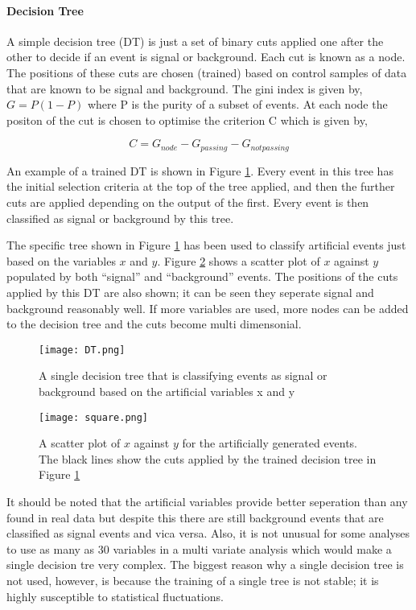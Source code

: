 \paragraph{Decision Tree}
A simple decision tree (DT) is just a set of binary cuts applied one after the other to decide if an event is signal or background.  Each cut is known as a node. The positions of these cuts are chosen (trained) based on control samples of data that are known to be signal and background.  The gini index is given by, $G=P(1-P)$ where P is the purity of a subset of events.  At each node the positon of the cut is chosen to optimise the criterion C which is given by,

\begin{equation}
  C=G_{node}-G_{passing}-G_{not passing}
\end{equation}

An example of a trained DT is shown in Figure \ref{fig:DT}.  Every event in this tree has the initial selection criteria at the top of the tree applied, and then the further cuts are applied depending on the output of the first.  Every event is then classified as signal or background by this tree.

The specific tree shown in Figure \ref{fig:DT} has been used to classify artificial events just based on the variables $x$ and $y$.  Figure \ref{fig:square} shows a scatter plot of $x$ against $y$ populated by both ``signal'' and ``background'' events.  The positions of the cuts applied by this DT are also shown; it can be seen they seperate signal and background reasonably well.  If more variables are used, more nodes can be added to the decision tree and the cuts become multi dimensonial.
\begin{figure}
  \centering
  \texttt{[image: DT.png]}
  \caption{A single decision tree that is classifying events as signal or background based on the artificial variables x and y}
  \label{fig:DT}
\end{figure}
\begin{figure}
  \centering
  \texttt{[image: square.png]}
  \caption{A scatter plot of $x$ against $y$ for the artificially generated events. The black lines show the cuts applied by the trained decision tree in Figure \ref{fig:DT}}
  \label{fig:square}
\end{figure}

It should be noted that the artificial variables provide better seperation than any found in real data but despite this there are still background events that are classified as signal events and vica versa. Also, it is not unusual for some analyses to use as many as 30 variables in a multi variate analysis which would make a single decision tre very complex.  The biggest reason why a single decision tree is not used, however, is because the training of a single tree is not stable; it is highly susceptible to statistical fluctuations.

